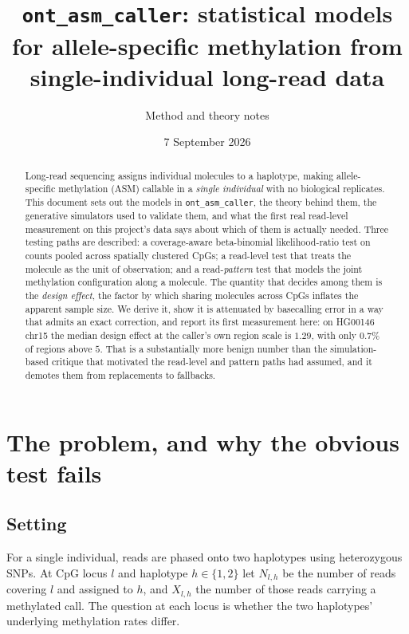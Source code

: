 \documentclass[11pt]{article}
\title{\texttt{ont\_asm\_caller}: statistical models for allele-specific
methylation from single-individual long-read data}
\author{Method and theory notes}
\date{7 September 2026}
\begin{document}
\maketitle

\begin{abstract}
\noindent
Long-read sequencing assigns individual molecules to a haplotype, making
allele-specific methylation (ASM) callable in a \emph{single individual} with no
biological replicates. This document sets out the models in
\texttt{ont\_asm\_caller}, the theory behind them, the generative simulators used
to validate them, and what the first real read-level measurement on this
project's data says about which of them is actually needed. Three testing paths
are described: a coverage-aware beta-binomial likelihood-ratio test on counts
pooled across spatially clustered CpGs; a read-level test that treats the
molecule as the unit of observation; and a read-\emph{pattern} test that models
the joint methylation configuration along a molecule. The quantity that decides
among them is the \emph{design effect}, the factor by which sharing molecules
across CpGs inflates the apparent sample size. We derive it, show it is
attenuated by basecalling error in a way that admits an exact correction, and
report its first measurement here: on HG00146 chr15 the median design effect at
the caller's own region scale is $1.29$, with only $0.7\%$ of regions above $5$.
That is a substantially more benign number than the simulation-based critique
that motivated the read-level and pattern paths had assumed, and it demotes them
from replacements to fallbacks.
\end{abstract}

\tableofcontents

\section{The problem, and why the obvious test fails}

\subsection{Setting}

For a single individual, reads are phased onto two haplotypes using
heterozygous SNPs. At CpG locus $l$ and haplotype $h \in \{1,2\}$ let $N_{l,h}$
be the number of reads covering $l$ and assigned to $h$, and $X_{l,h}$ the
number of those reads carrying a methylated call. The question at each locus is
whether the two haplotypes' underlying methylation rates differ.
\end{document}
